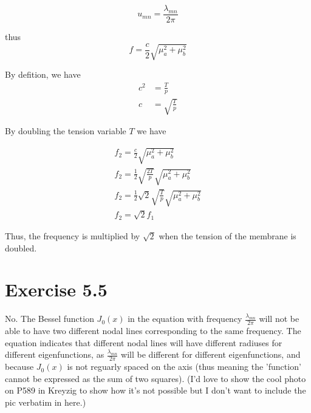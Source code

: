 \documentclass{article}
\begin{document}
$$
u_{mn} = \frac{\lambda_{mn}}{2\pi }
$$

thus
$$
f = \frac{c}{2} \sqrt{\mu_a^2 + \mu_b^2}
$$

By defition, we have 
\begin{align*}
c^2 &= \frac{T}{p}\\
c &= \sqrt{\frac{T}{p}}
\end{align*}

By doubling the tension variable $T$ we have

\begin{align*}
f_2 = \frac{c}{2} \sqrt{\mu_a^2 + \mu_b^2} \\
f_2 = \frac{1}{2} \sqrt{\frac{2T}{p}}\sqrt{\mu_a^2 + \mu_b^2} \\
f_2 = \frac{1}{2} \sqrt{2} \sqrt{\frac{T}{p}}\sqrt{\mu_a^2 + \mu_b^2} \\
f_2 = \sqrt{2} f_1
\end{align*}

Thus, the frequency is multiplied by $\sqrt{2}$ when the tension of the membrane is doubled.

\section*{Exercise 5.5}

No. The Bessel function $J_0(x)$ in the equation with frequency $\frac{\lambda_{mn}}{2\pi}$ will not be able to have two different nodal lines corresponding to the same frequency.
The equation indicates that different nodal lines will have different radiuses for different eigenfunctions, as $\frac{\lambda_{mn}}{2\pi}$ will be different for different eigenfunctions, and because $J_0(x)$ is not reguarly spaced on the axis (thus meaning the 'function' cannot be expressed as the sum of two squares). (I'd love to show the cool photo on P589 in Kreyzig to show how it's not possible but I don't want to include the pic verbatim in here.)
\end{document}
